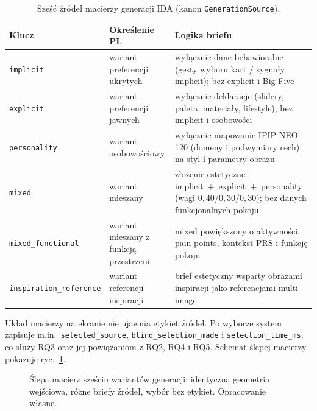 \begin{table}[htbp]
  \centering
  \caption{Sześć źródeł macierzy generacji IDA (kanon \texttt{GenerationSource}).}
  \label{tab:ch07:sources}
  \begin{tabular}{@{}>{\raggedright\arraybackslash}p{}>{\raggedright\arraybackslash}p{}>{\raggedright\arraybackslash}p{}@{}}
    \toprule
    Klucz & Określenie PL & Logika briefu \\
    \midrule
    \texttt{implicit} &
    wariant preferencji ukrytych &
    wyłącznie dane behawioralne (gesty wyboru kart / sygnały implicit); bez explicit i Big Five \\
    \texttt{explicit} &
    wariant preferencji jawnych &
    wyłącznie deklaracje (slidery, paleta, materiały, lifestyle); bez implicit i osobowości \\
    \texttt{personality} &
    wariant osobowościowy &
    wyłącznie mapowanie IPIP-NEO-120 (domeny i podwymiary cech) na styl i parametry obrazu \\
    \texttt{mixed} &
    wariant mieszany &
    złożenie estetyczne implicit~+~explicit~+~personality (wagi $0{,}40$/$0{,}30$/$0{,}30$); bez danych funkcjonalnych pokoju \\
    \texttt{mixed\_functional} &
    wariant mieszany z funkcją przestrzeni &
    mixed powiększony o aktywności, pain points, kontekst PRS i funkcję pokoju \\
    \texttt{inspiration\_reference} &
    wariant referencji inspiracji &
    brief estetyczny wsparty obrazami inspiracji jako referencjami multi-image \\
    \bottomrule
  \end{tabular}
\end{table}

Układ macierzy na ekranie nie ujawnia etykiet źródeł. Po wyborze system zapisuje m.in.\ \texttt{selected\_source}, \texttt{blind\_selection\_made} i \texttt{selection\_time\_ms}, co służy RQ3 oraz jej powiązaniom z RQ2, RQ4 i RQ5. Schemat ślepej macierzy pokazuje ryc.~\ref{fig:ch07:matrix}.

\begin{figure}[htbp]
  \centering
  \caption{Ślepa macierz sześciu wariantów generacji: identyczna geometria wejściowa, różne briefy źródeł, wybór bez etykiet. Opracowanie własne.}
  \label{fig:ch07:matrix}
\end{figure}

